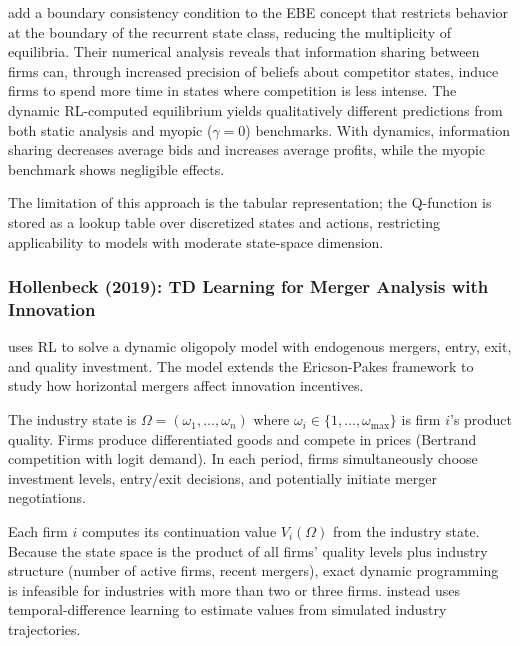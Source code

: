 \citet{AskerEtAl2020} add a boundary consistency condition to the EBE concept that restricts behavior at the boundary of the recurrent state class, reducing the multiplicity of equilibria. Their numerical analysis reveals that information sharing between firms can, through increased precision of beliefs about competitor states, induce firms to spend more time in states where competition is less intense. The dynamic RL-computed equilibrium yields qualitatively different predictions from both static analysis and myopic ($\gamma = 0$) benchmarks. With dynamics, information sharing decreases average bids and increases average profits, while the myopic benchmark shows negligible effects.

The limitation of this approach is the tabular representation; the Q-function is stored as a lookup table over discretized states and actions, restricting applicability to models with moderate state-space dimension.


\subsubsection{Hollenbeck (2019): TD Learning for Merger Analysis with Innovation}

\citet{Hollenbeck2019} uses RL to solve a dynamic oligopoly model with endogenous mergers, entry, exit, and quality investment. The model extends the Ericson-Pakes framework to study how horizontal mergers affect innovation incentives.

The industry state is $\Omega = (\omega_1, \ldots, \omega_n)$ where $\omega_i \in \{1, \ldots, \omega_{\max}\}$ is firm $i$'s product quality. Firms produce differentiated goods and compete in prices (Bertrand competition with logit demand). In each period, firms simultaneously choose investment levels, entry/exit decisions, and potentially initiate merger negotiations.

Each firm $i$ computes its continuation value $V_i(\Omega)$ from the industry state. Because the state space is the product of all firms' quality levels plus industry structure (number of active firms, recent mergers), exact dynamic programming is infeasible for industries with more than two or three firms. \citet{Hollenbeck2019} instead uses temporal-difference learning to estimate values from simulated industry trajectories.

